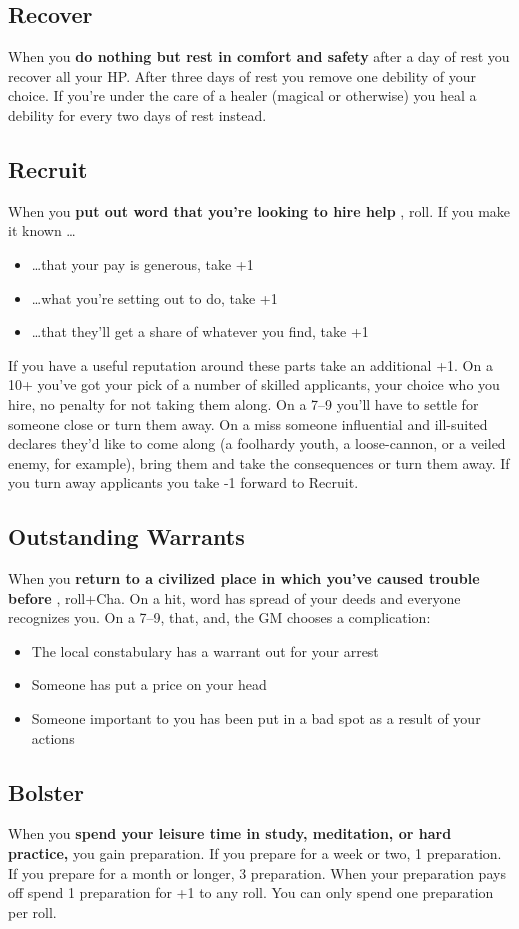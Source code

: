 \subsection{Recover}


 When you \textbf{do nothing but rest in comfort and safety}
 after a day of rest you recover all your HP. After three days of rest you remove one debility of your choice. If you're under the care of a healer (magical or otherwise) you heal a debility for every two days of rest instead.
\subsection{Recruit}


 When you \textbf{put out word that you're looking to hire help}
, roll. If you make it known \ldots 
\begin{itemize}
\item  \ldots that your pay is generous, take +1
\item  \ldots what you're setting out to do, take +1
\item  \ldots that they'll get a share of whatever you find, take +1

\end{itemize}


 If you have a useful reputation around these parts take an additional +1. On a 10+ you've got your pick of a number of skilled applicants, your choice who you hire, no penalty for not taking them along. On a 7--9 you'll have to settle for someone close or turn them away. On a miss someone influential and ill-suited declares they'd like to come along (a foolhardy youth, a loose-cannon, or a veiled enemy, for example), bring them and take the consequences or turn them away. If you turn away applicants you take -1 forward to Recruit.
\subsection{Outstanding Warrants}


 When you \textbf{return to a civilized place in which you've caused trouble before}
, roll+Cha. On a hit, word has spread of your deeds and everyone recognizes you. On a 7--9, that, and, the GM chooses a complication:
\begin{itemize}
\item The local constabulary has a warrant out for your arrest
\item Someone has put a price on your head
\item Someone important to you has been put in a bad spot as a result of your actions
\end{itemize}
\subsection{Bolster}


 When you \textbf{spend your leisure time in study, meditation, or hard practice,}
 you gain preparation. If you prepare for a week or two, 1 preparation. If you prepare for a month or longer, 3 preparation. When your preparation pays off spend 1 preparation for +1 to any roll. You can only spend one preparation per roll.


